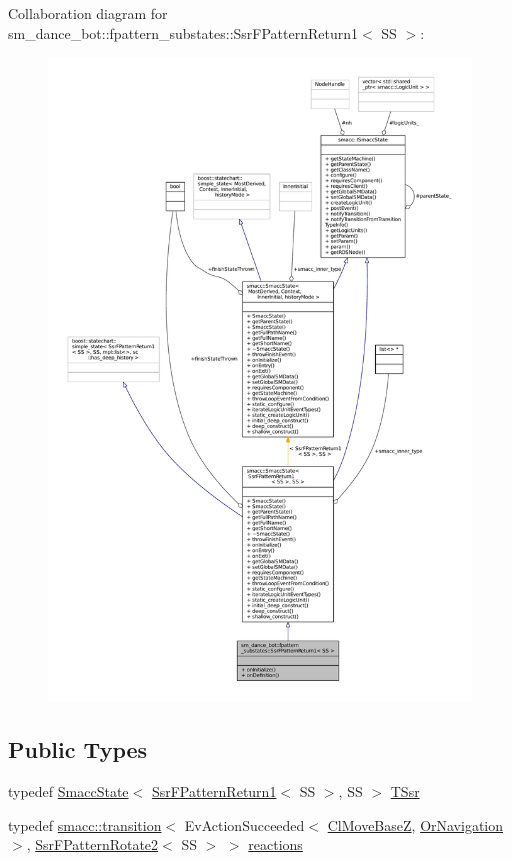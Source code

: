 Collaboration diagram for sm\+\_\+dance\+\_\+bot\+:\+:fpattern\+\_\+substates\+:\+:Ssr\+F\+Pattern\+Return1$<$ SS $>$\+:
\nopagebreak
\begin{figure}[H]
\begin{center}
\leavevmode
\includegraphics[width=350pt]{structsm__dance__bot_1_1fpattern__substates_1_1SsrFPatternReturn1__coll__graph}
\end{center}
\end{figure}
\subsection*{Public Types}
\begin{DoxyCompactItemize}
\item 
typedef \hyperlink{classSmaccState}{Smacc\+State}$<$ \hyperlink{structsm__dance__bot_1_1fpattern__substates_1_1SsrFPatternReturn1}{Ssr\+F\+Pattern\+Return1}$<$ SS $>$, SS $>$ \hyperlink{structsm__dance__bot_1_1fpattern__substates_1_1SsrFPatternReturn1_a93f24753013f0801c2d311b8535a9127}{T\+Ssr}
\item 
typedef \hyperlink{classsmacc_1_1transition}{smacc\+::transition}$<$ Ev\+Action\+Succeeded$<$ \hyperlink{classmove__base__z__client_1_1ClMoveBaseZ}{Cl\+Move\+BaseZ}, \hyperlink{classsm__dance__bot_1_1OrNavigation}{Or\+Navigation} $>$, \hyperlink{structsm__dance__bot_1_1fpattern__substates_1_1SsrFPatternRotate2}{Ssr\+F\+Pattern\+Rotate2}$<$ SS $>$ $>$ \hyperlink{structsm__dance__bot_1_1fpattern__substates_1_1SsrFPatternReturn1_ac172f5873bf6466a13b6e3a32cb64fff}{reactions}
\end{DoxyCompactItemize}
